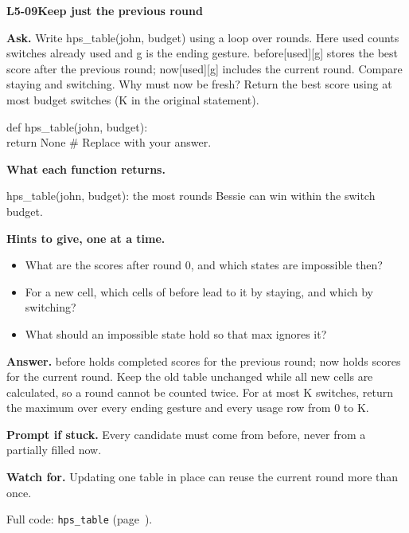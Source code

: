 \documentclass[11pt,a4paper]{article}
\begin{document}
\noindent\begin{minipage}{\textwidth}
{\color{teal}\textbf{L5-09}}\quad \textbf{Keep just the previous round}\par\smallskip
\textbf{Ask.} Write hps\_table(john, budget) using a loop over rounds. Here used counts switches already used and g is the ending gesture. before[used][g] stores the best score after the previous round; now[used][g] includes the current round. Compare staying and switching. Why must now be fresh? Return the best score using at most budget switches (K in the original statement).\par\smallskip
\par{}\par\smallskip\noindent\colorbox{codepaper}{\parbox{\dimexpr\linewidth-2\fboxsep\relax}{\small\ttfamily\raggedright def hps\_table(john, budget):\\\hspace*{2.4em}return None  \# Replace with your answer.}}\par
{\small\textbf{What each function returns.}\par hps\_table(john, budget): the most rounds Bessie can win within the switch budget.\par }
{\small\textbf{Hints to give, one at a time.}}\begin{itemize}\item What are the scores after round 0, and which states are impossible then?\item For a new cell, which cells of before lead to it by staying, and which by switching?\item What should an impossible state hold so that max ignores it?\end{itemize}
\textbf{Answer.} before holds completed scores for the previous round; now holds scores for the current round. Keep the old table unchanged while all new cells are calculated, so a round cannot be counted twice. For at most K switches, return the maximum over every ending gesture and every usage row from 0 to K.\par\smallskip
\textbf{Prompt if stuck.} Every candidate must come from before, never from a partially filled now.\par\smallskip
\textbf{Watch for.} Updating one table in place can reuse the current round more than once.\par\smallskip Full code: \texttt{hps\_table} (page~\pageref{L5-code-hps_table}).
\end{minipage}\par{}\medskip
\end{document}
